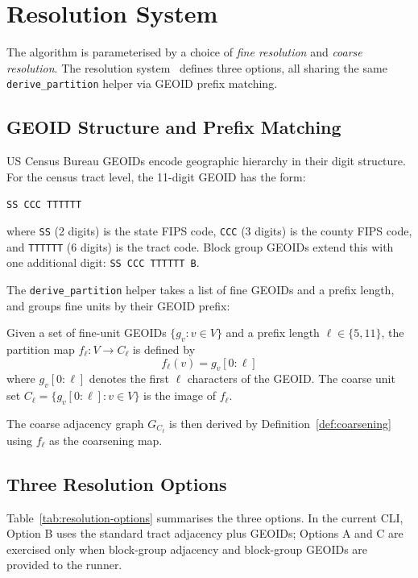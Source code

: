 \section{Resolution System}
\label{sec:resolution}

The \ms{} algorithm is parameterised by a choice of \emph{fine resolution}
and \emph{coarse resolution}.
The resolution system~\citep{dellaLibera2026resolution} defines three
options, all sharing the same \texttt{derive\_partition} helper via GEOID
prefix matching.

\subsection{GEOID Structure and Prefix Matching}

US Census Bureau GEOIDs encode geographic hierarchy in their digit structure.
For the census tract level, the 11-digit GEOID has the form:
\begin{center}
\texttt{SS CCC TTTTTT}
\end{center}
where \texttt{SS} (2 digits) is the state FIPS code, \texttt{CCC} (3 digits)
is the county FIPS code, and \texttt{TTTTTT} (6 digits) is the tract code.
Block group GEOIDs extend this with one additional digit: \texttt{SS CCC TTTTTT B}.

The \texttt{derive\_partition} helper takes a list of fine GEOIDs and a
prefix length, and groups fine units by their GEOID prefix:

\begin{definition}
\label{def:derive-partition}
Given a set of fine-unit GEOIDs $\{g_v : v \in V\}$ and a prefix length
$\ell \in \{5, 11\}$, the partition map $f_\ell : V \to C_\ell$ is defined
by
\[
  f_\ell(v) = g_v[0{:}\ell]
\]
where $g_v[0{:}\ell]$ denotes the first $\ell$ characters of the GEOID.
The coarse unit set $C_\ell = \{g_v[0{:}\ell] : v \in V\}$ is the image
of $f_\ell$.
\end{definition}

The coarse adjacency graph $G_{C_\ell}$ is then derived by
Definition~\ref{def:coarsening} using $f_\ell$ as the coarsening map.

\subsection{Three Resolution Options}

Table~\ref{tab:resolution-options} summarises the three options. In the current
CLI, Option B uses the standard tract adjacency plus GEOIDs; Options A and C
are exercised only when block-group adjacency and block-group GEOIDs are
provided to the runner.

